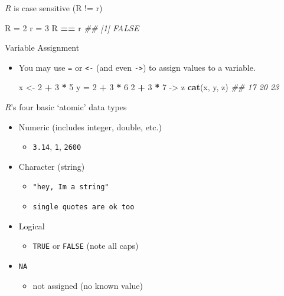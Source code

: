 \documentclass[
]{book}
\newenvironment{Shaded}{\begin{snugshade}}{\end{snugshade}}
\newcommand{\CommentTok}[1]{\textcolor[rgb]{0.56,0.35,0.01}{\textit{#1}}}
\newcommand{\DecValTok}[1]{\textcolor[rgb]{0.00,0.00,0.81}{#1}}
\newcommand{\KeywordTok}[1]{\textcolor[rgb]{0.13,0.29,0.53}{\textbf{#1}}}
\newcommand{\NormalTok}[1]{#1}
\newcommand{\OperatorTok}[1]{\textcolor[rgb]{0.81,0.36,0.00}{\textbf{#1}}}
\newcommand{\StringTok}[1]{\textcolor[rgb]{0.31,0.60,0.02}{#1}}
\providecommand{\tightlist}{%
  \setlength{\itemsep}{0pt}\setlength{\parskip}{0pt}}
\begin{document}
\emph{R} is case sensitive (R != r)

\begin{Shaded}
\begin{Highlighting}[]
\NormalTok{R =}\StringTok{ }\DecValTok{2}
\NormalTok{r =}\StringTok{ }\DecValTok{3}
\NormalTok{R }\OperatorTok{==}\StringTok{ }\NormalTok{r}
\CommentTok{## [1] FALSE}
\end{Highlighting}
\end{Shaded}

Variable Assignment

\begin{itemize}
\item
  You may use \texttt{=} or \texttt{\textless{}-} (and even \texttt{-\textgreater{}}) to assign values to a variable.

\begin{Shaded}
\begin{Highlighting}[]
\NormalTok{x <-}\StringTok{ }\DecValTok{2} \OperatorTok{+}\StringTok{ }\DecValTok{3} \OperatorTok{*}\StringTok{ }\DecValTok{5}
\NormalTok{y =}\StringTok{  }\DecValTok{2} \OperatorTok{+}\StringTok{ }\DecValTok{3} \OperatorTok{*}\StringTok{ }\DecValTok{6}
\DecValTok{2} \OperatorTok{+}\StringTok{ }\DecValTok{3} \OperatorTok{*}\StringTok{ }\DecValTok{7}\NormalTok{ ->}\StringTok{ }\NormalTok{z}
\KeywordTok{cat}\NormalTok{(x, y, z)}
\CommentTok{## 17 20 23}
\end{Highlighting}
\end{Shaded}
\end{itemize}

\emph{R}'s four basic `atomic' data types

\begin{itemize}
\tightlist
\item
  Numeric (includes integer, double, etc.)

  \begin{itemize}
  \tightlist
  \item
    \texttt{3.14}, \texttt{1}, \texttt{2600}
  \end{itemize}
\item
  Character (string)

  \begin{itemize}
  \tightlist
  \item
    \texttt{"hey,\ I\textquotesingle{}m\ a\ string"}
  \item
    \texttt{\textquotesingle{}single\ quotes\ are\ ok\ too\textquotesingle{}}
  \end{itemize}
\item
  Logical

  \begin{itemize}
  \tightlist
  \item
    \texttt{TRUE} or \texttt{FALSE} (note all caps)
  \end{itemize}
\item
  \texttt{NA}

  \begin{itemize}
  \tightlist
  \item
    not assigned (no known value)
  \end{itemize}
\end{itemize}
\end{document}
